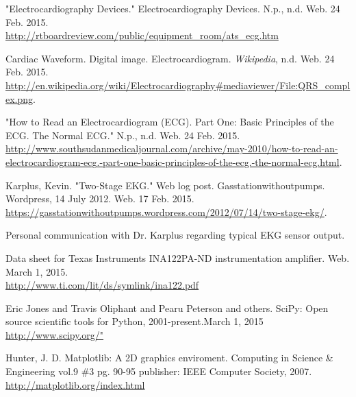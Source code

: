 \documentclass[11pt, oneside]{article}   	%
\begin{document}
\begin{thebibliography}{11}

"Electrocardiography Devices." Electrocardiography Devices. N.p., n.d. Web. 24 Feb. 2015. \\ \url{http://rtboardreview.com/public/equipment_room/ats_ecg.htm}

Cardiac Waveform. Digital image. Electrocardiogram. \textit{Wikipedia}, n.d. Web. 24 Feb. 2015. \\ \url{http://en.wikipedia.org/wiki/Electrocardiography#mediaviewer/File:QRS_complex.png}.

"How to Read an Electrocardiogram (ECG). Part One: Basic Principles of the ECG. The Normal ECG." N.p., n.d. Web. 24 Feb. 2015. \\ \url{http://www.southsudanmedicaljournal.com/archive/may-2010/how-to-read-an-electrocardiogram-ecg.-part-one-basic-principles-of-the-ecg.-the-normal-ecg.html}.

Karplus, Kevin. "Two-Stage EKG." Web log post. Gasstationwithoutpumps. Wordpress, 14 July 2012. Web. 17 Feb. 2015. \\ \url{https://gasstationwithoutpumps.wordpress.com/2012/07/14/two-stage-ekg/}.

Personal communication with Dr. Karplus regarding typical EKG sensor output.

Data sheet for Texas Instruments INA122PA-ND instrumentation amplifier. Web. March 1, 2015.\\ \url{http://www.ti.com/lit/ds/symlink/ina122.pdf}

Eric Jones and Travis Oliphant and Pearu Peterson and others. SciPy: Open source scientific tools for Python, 2001-present.March 1, 2015
\url{http://www.scipy.org/"}

Hunter, J. D. Matplotlib: A 2D graphics enviroment.
Computing in Science \& Engineering vol.9 \#3 pg. 90-95
publisher: IEEE Computer Society, 2007. \url{http://matplotlib.org/index.html}



\end{thebibliography}
\end{document}
